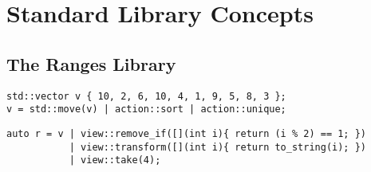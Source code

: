 \section{Standard Library Concepts}

\subsection{The Ranges Library} \label{sec:the_ranges_library}

    \begin{lstlisting}
std::vector v { 10, 2, 6, 10, 4, 1, 9, 5, 8, 3 };
v = std::move(v) | action::sort | action::unique; \end{lstlisting}

    \begin{lstlisting}
auto r = v | view::remove_if([](int i){ return (i % 2) == 1; })
           | view::transform([](int i){ return to_string(i); })
           | view::take(4); \end{lstlisting}
